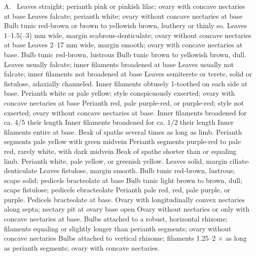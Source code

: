 \documentclass{ctexart}
\begin{document}
\begin{Key*}{A.~}
\alter Leaves straight; perianth pink or pinkish lilac; ovary with concave nectaries at base
\alter Leaves falcate; perianth white; ovary without concave nectaries at base
\alter Bulb tunic red-brown or brown to yellowish brown, leathery or thinly so.
\alter Leaves 1--1.5(--3) mm wide, margin scabrous-denticulate; ovary without concave nectaries at base
\alter Leaves 2--17 mm wide, margin smooth; ovary with concave nectaries at base.
\alter Bulb tunic red-brown, lustrous
\alter Bulb tunic brown to yellowish brown, dull.
\alter Leaves usually falcate; inner filaments broadened at base
\alter Leaves usually not falcate; inner filaments not broadened at base
\alter Leaves semiterete or terete, solid or fistulose, adaxially channeled.
\alter Inner filaments obtusely 1-toothed on each side at base.
\alter Perianth white or pale yellow; style conspicuously exserted; ovary with concave nectaries at base
\alter Perianth red, pale purple-red, or purple-red; style not exserted; ovary without concave nectaries at base.
\alter Inner filaments broadened for ca. 4/5 their length
\alter Inner filaments broadened for ca. 1/2 their length
\alter Inner filaments entire at base.
\alter Beak of spathe several times as long as limb.
\alter Perianth segments pale yellow with green midvein
\alter Perianth segments purple-red to pale red, rarely white, with dark midvein
\alter Beak of spathe shorter than or equaling limb.
\alter Perianth white, pale yellow, or greenish yellow.
\alter Leaves solid, margin ciliate-denticulate
\alter Leaves fistulose, margin smooth.
\alter Bulb tunic red-brown, lustrous; scape solid; pedicels bracteolate at base
\alter Bulb tunic light brown to brown, dull; scape fistulose; pedicels ebracteolate
\alter Perianth pale red, red, pale purple, or purple.
\alter Pedicels bracteolate at base.
\alter Ovary with longitudinally convex nectaries along septa; nectary pit at ovary base open
\alter Ovary without nectaries or only with concave nectaries at base.
\alter Bulbs attached to a robust, horizontal rhizome; filaments equaling or slightly longer than perianth segments; ovary without concave nectaries
\alter Bulbs attached to vertical rhizome; filaments 1.25--2 × as long as perianth segments; ovary with concave nectaries.

\end{Key*}
\end{document}
